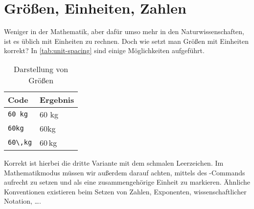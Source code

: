 \section{Größen, Einheiten, Zahlen}

Weniger in der Mathematik, aber dafür umso mehr in den Naturwissenschaften, ist es üblich mit Einheiten zu rechnen.
Doch wie setzt man Größen mit Einheiten korrekt?
In \autoref{tab:unit-spacing} sind einige Möglichkeiten aufgeführt.
\begin{table}[!h]
	\begin{tabular}{l l}
		\toprule
		\textbf{Code} & \textbf{Ergebnis}\tabularnewline
		\midrule
		\texttt{60 kg}&
		60 kg
		\tabularnewline
		\texttt{60kg}&
		60kg
		\tabularnewline
		\texttt{60\textbackslash,kg}&
		60\,kg
		\tabularnewline
		\bottomrule
	\end{tabular}
	\caption{Darstellung von Größen}
	\label{tab:unit-spacing}
\end{table}
Korrekt ist hierbei die dritte Variante mit dem schmalen Leerzeichen.
Im Mathematikmodus müssen wir außerdem darauf achten,  mittels des -Commands aufrecht zu setzen und als eine zusammengehörige Einheit zu markieren.
Ähnliche Konventionen existieren beim Setzen von Zahlen, Exponenten, wissenschaftlicher Notation, \dots.

